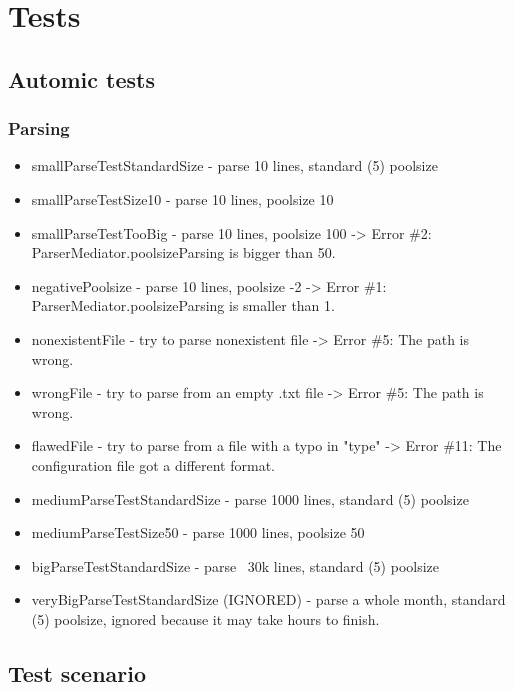 \section{Tests}

\subsection{Automic tests}
\subsubsection{Parsing}

\begin{itemize}

\item smallParseTestStandardSize - parse 10 lines, standard (5) poolsize
\item smallParseTestSize10 - parse 10 lines, poolsize 10
\item smallParseTestTooBig - parse 10 lines, poolsize 100 -> Error \#2: ParserMediator.poolsizeParsing is bigger than 50.
\item negativePoolsize - parse 10 lines, poolsize -2 -> Error \#1: ParserMediator.poolsizeParsing is smaller than 1.
\item nonexistentFile - try to parse nonexistent file -> Error \#5: The path is wrong.
\item wrongFile - try to parse from an empty .txt file -> Error \#5: The path is wrong.
\item flawedFile - try to parse from a file with a typo in "type" -> Error \#11: The configuration file got a different format.
\item mediumParseTestStandardSize - parse 1000 lines, standard (5) poolsize
\item mediumParseTestSize50 - parse 1000 lines, poolsize 50
\item bigParseTestStandardSize - parse ~30k lines, standard (5) poolsize
\item veryBigParseTestStandardSize (IGNORED) - parse a whole month, standard (5) poolsize, ignored because it may take hours 
to finish.

\end{itemize}

\subsection{Test scenario}

